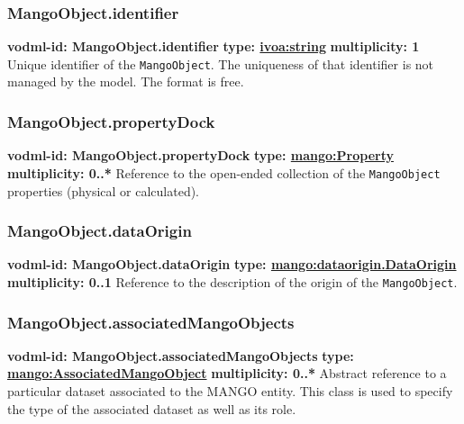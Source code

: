     \subsubsection{MangoObject.identifier}
      \textbf{vodml-id: MangoObject.identifier} \newline
      \textbf{type: \hyperref[sect:ivoa]{ivoa:string}} \newline
      \textbf{multiplicity: 1} \newline
      Unique identifier of the \texttt{MangoObject}. The uniqueness of that identifier is not managed by the model. The format is free.

    \subsubsection{MangoObject.propertyDock}
      \textbf{vodml-id: MangoObject.propertyDock} \newline
      \textbf{type: \hyperref[sect:Property]{mango:Property}} \newline
      \textbf{multiplicity: 0..*} \newline
      Reference to the open-ended collection of the \texttt{MangoObject} properties (physical or calculated).

    \subsubsection{MangoObject.dataOrigin}
      \textbf{vodml-id: MangoObject.dataOrigin} \newline
      \textbf{type: \hyperref[sect:dataorigin.DataOrigin]{mango:dataorigin.DataOrigin}} \newline
      \textbf{multiplicity: 0..1} \newline
      Reference to the description of the origin of the \texttt{MangoObject}.

    \subsubsection{MangoObject.associatedMangoObjects}
      \textbf{vodml-id: MangoObject.associatedMangoObjects} \newline
      \textbf{type: \hyperref[sect:AssociatedMangoObject]{mango:AssociatedMangoObject}} \newline
      \textbf{multiplicity: 0..*} \newline
      Abstract reference to a particular dataset associated to the MANGO entity. This class is used to specify the type of the associated dataset as well as its role.


